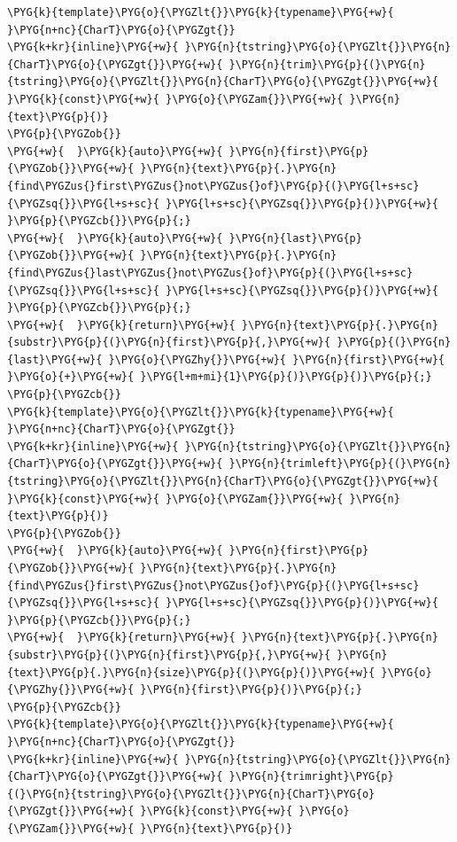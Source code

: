 \begin{codeblockbg}
\begin{Verbatim}[commandchars=\\\{\},breaklines=true,breakanywhere=true,fontsize=\codefont,xleftmargin=17bp]
\PYG{k}{template}\PYG{o}{\PYGZlt{}}\PYG{k}{typename}\PYG{+w}{ }\PYG{n+nc}{CharT}\PYG{o}{\PYGZgt{}}
\PYG{k+kr}{inline}\PYG{+w}{ }\PYG{n}{tstring}\PYG{o}{\PYGZlt{}}\PYG{n}{CharT}\PYG{o}{\PYGZgt{}}\PYG{+w}{ }\PYG{n}{trim}\PYG{p}{(}\PYG{n}{tstring}\PYG{o}{\PYGZlt{}}\PYG{n}{CharT}\PYG{o}{\PYGZgt{}}\PYG{+w}{ }\PYG{k}{const}\PYG{+w}{ }\PYG{o}{\PYGZam{}}\PYG{+w}{ }\PYG{n}{text}\PYG{p}{)}
\PYG{p}{\PYGZob{}}
\PYG{+w}{  }\PYG{k}{auto}\PYG{+w}{ }\PYG{n}{first}\PYG{p}{\PYGZob{}}\PYG{+w}{ }\PYG{n}{text}\PYG{p}{.}\PYG{n}{find\PYGZus{}first\PYGZus{}not\PYGZus{}of}\PYG{p}{(}\PYG{l+s+sc}{\PYGZsq{}}\PYG{l+s+sc}{ }\PYG{l+s+sc}{\PYGZsq{}}\PYG{p}{)}\PYG{+w}{ }\PYG{p}{\PYGZcb{}}\PYG{p}{;}
\PYG{+w}{  }\PYG{k}{auto}\PYG{+w}{ }\PYG{n}{last}\PYG{p}{\PYGZob{}}\PYG{+w}{ }\PYG{n}{text}\PYG{p}{.}\PYG{n}{find\PYGZus{}last\PYGZus{}not\PYGZus{}of}\PYG{p}{(}\PYG{l+s+sc}{\PYGZsq{}}\PYG{l+s+sc}{ }\PYG{l+s+sc}{\PYGZsq{}}\PYG{p}{)}\PYG{+w}{ }\PYG{p}{\PYGZcb{}}\PYG{p}{;}
\PYG{+w}{  }\PYG{k}{return}\PYG{+w}{ }\PYG{n}{text}\PYG{p}{.}\PYG{n}{substr}\PYG{p}{(}\PYG{n}{first}\PYG{p}{,}\PYG{+w}{ }\PYG{p}{(}\PYG{n}{last}\PYG{+w}{ }\PYG{o}{\PYGZhy{}}\PYG{+w}{ }\PYG{n}{first}\PYG{+w}{ }\PYG{o}{+}\PYG{+w}{ }\PYG{l+m+mi}{1}\PYG{p}{)}\PYG{p}{)}\PYG{p}{;}
\PYG{p}{\PYGZcb{}}
\PYG{k}{template}\PYG{o}{\PYGZlt{}}\PYG{k}{typename}\PYG{+w}{ }\PYG{n+nc}{CharT}\PYG{o}{\PYGZgt{}}
\PYG{k+kr}{inline}\PYG{+w}{ }\PYG{n}{tstring}\PYG{o}{\PYGZlt{}}\PYG{n}{CharT}\PYG{o}{\PYGZgt{}}\PYG{+w}{ }\PYG{n}{trimleft}\PYG{p}{(}\PYG{n}{tstring}\PYG{o}{\PYGZlt{}}\PYG{n}{CharT}\PYG{o}{\PYGZgt{}}\PYG{+w}{ }\PYG{k}{const}\PYG{+w}{ }\PYG{o}{\PYGZam{}}\PYG{+w}{ }\PYG{n}{text}\PYG{p}{)}
\PYG{p}{\PYGZob{}}
\PYG{+w}{  }\PYG{k}{auto}\PYG{+w}{ }\PYG{n}{first}\PYG{p}{\PYGZob{}}\PYG{+w}{ }\PYG{n}{text}\PYG{p}{.}\PYG{n}{find\PYGZus{}first\PYGZus{}not\PYGZus{}of}\PYG{p}{(}\PYG{l+s+sc}{\PYGZsq{}}\PYG{l+s+sc}{ }\PYG{l+s+sc}{\PYGZsq{}}\PYG{p}{)}\PYG{+w}{ }\PYG{p}{\PYGZcb{}}\PYG{p}{;}
\PYG{+w}{  }\PYG{k}{return}\PYG{+w}{ }\PYG{n}{text}\PYG{p}{.}\PYG{n}{substr}\PYG{p}{(}\PYG{n}{first}\PYG{p}{,}\PYG{+w}{ }\PYG{n}{text}\PYG{p}{.}\PYG{n}{size}\PYG{p}{(}\PYG{p}{)}\PYG{+w}{ }\PYG{o}{\PYGZhy{}}\PYG{+w}{ }\PYG{n}{first}\PYG{p}{)}\PYG{p}{;}
\PYG{p}{\PYGZcb{}}
\PYG{k}{template}\PYG{o}{\PYGZlt{}}\PYG{k}{typename}\PYG{+w}{ }\PYG{n+nc}{CharT}\PYG{o}{\PYGZgt{}}
\PYG{k+kr}{inline}\PYG{+w}{ }\PYG{n}{tstring}\PYG{o}{\PYGZlt{}}\PYG{n}{CharT}\PYG{o}{\PYGZgt{}}\PYG{+w}{ }\PYG{n}{trimright}\PYG{p}{(}\PYG{n}{tstring}\PYG{o}{\PYGZlt{}}\PYG{n}{CharT}\PYG{o}{\PYGZgt{}}\PYG{+w}{ }\PYG{k}{const}\PYG{+w}{ }\PYG{o}{\PYGZam{}}\PYG{+w}{ }\PYG{n}{text}\PYG{p}{)}

\end{Verbatim}
\end{codeblockbg}
